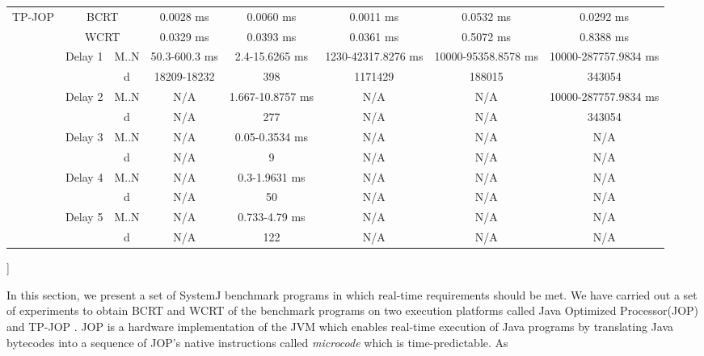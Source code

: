 \begin{table}[t]
\begin{@twocolumnfalse}
{\begin{tabular}{|c| c | c | c | c | c | c | c |}
	\multirow{12}{*}{TP-JOP} 	& \multicolumn{2}{|c|}{BCRT} 		&0.0028 ms 		& 0.0060 ms		  & 0.0011 ms		  & 0.0532 ms		   & 0.0292 ms\\ \cline{2-8}   
        & \multicolumn{2}{|c|}{WCRT} 		&0.0329 ms 		& 0.0393 ms		  & 0.0361 ms		  & 0.5072 ms		   & 0.8388 ms\\ \cline{2-8} 
        & \multirow{2}{*}{Delay 1}	 & M..N &50.3-600.3 ms 	& 2.4-15.6265 ms  & 1230-42317.8276 ms& 10000-95358.8578 ms& 10000-287757.9834 ms \\ \cline{3-8} 
        &			   & d			 		&18209-18232 	& 398 			  & 1171429			  & 188015		       &343054\\ \cline{2-8}
        & \multirow{2}{*}{Delay 2}	 & M..N & 	N/A 		& 1.667-10.8757 ms& N/A				  & N/A 			   &10000-287757.9834 ms\\ \cline{3-8} 
        &			   & d			 		& 	N/A	 		& 277			  & N/A				  & N/A       		   &343054\\ \cline{2-8}
        & \multirow{2}{*}{Delay 3}	 & M..N & 	N/A	 		& 0.05-0.3534 ms  & N/A				  & N/A       		   &N/A\\ \cline{3-8} 
        &			   & d			 		& 	N/A	 		& 9		      	  &	N/A				  & N/A       		   &N/A\\ \cline{2-8}
        & \multirow{2}{*}{Delay 4}	 & M..N & 	N/A	 		& 0.3-1.9631 ms   & N/A				  &	N/A       		   &N/A\\ \cline{3-8} 
        &			   & d				 	& 	N/A	 		& 50			  & N/A				  &	N/A      		   &N/A\\ \cline{2-8}
        & \multirow{2}{*}{Delay 5}	 & M..N & 	N/A	 		& 0.733-4.79 ms   & N/A				  &	N/A      		   &N/A\\ \cline{3-8} 
        &			   & d			 		& 	N/A	 		& 122 			  &	N/A				  & N/A      		   &N/A\\ \cline{2-8}
	\hline
      \end{tabular}
    }
  \end{@twocolumnfalse}
  ]

\end{table}
In this section, we present a set of SystemJ benchmark programs in which
real-time requirements should be met.  We have carried out a set of
experiments to obtain BCRT and WCRT of the benchmark programs on two
execution platforms called Java Optimized Processor(JOP)
\cite{jop:jnl:jsa2007} and TP-JOP \cite{6119095}. JOP is a hardware
implementation of the JVM which enables real-time execution of Java
programs by translating Java bytecodes into a sequence of JOP's native
instructions called \emph{microcode} which is time-predictable. As
